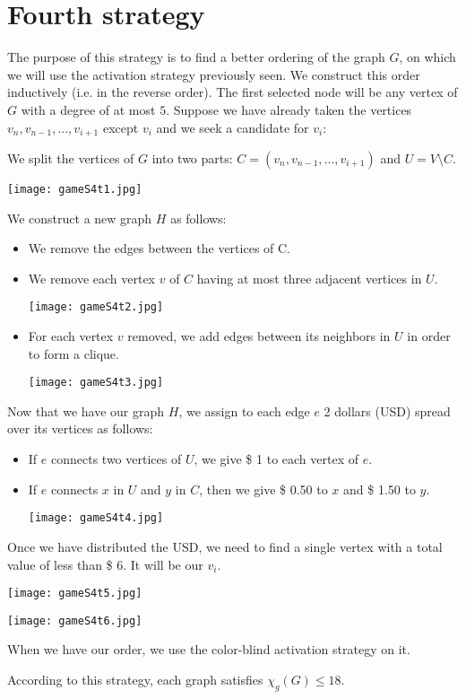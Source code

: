 \section{Fourth strategy}

The purpose of this strategy is to find a better ordering of the graph $G$, on which we will use the activation strategy previously seen. We construct this order inductively (i.e. in the reverse order). The first selected node will be any vertex of $G$ with a degree of at most $5$.
Suppose we have already taken the vertices $v_{n}, v_{n-1}, ..., v_{i+1}$ except $v_{i}$ and we seek a candidate for $v_{i}$:

We split the vertices of $G$ into two parts: $C = (v_{n}, v_{n-1}, ..., v_{i+1})$ and $U = V \setminus C$.

\texttt{[image: gameS4t1.jpg]}

We construct a new graph $H$ as follows:
\begin{itemize}
\item We remove the edges between the vertices of C.
\item We remove each vertex $v$ of $C$ having at most three adjacent vertices in $U$.

\texttt{[image: gameS4t2.jpg]}

\item For each vertex $v$ removed, we add edges between its neighbors in $U$ in order to form a clique.

\texttt{[image: gameS4t3.jpg]}

\end{itemize}

Now that we have our graph $H$, we assign to each edge $e$ 2 dollars (USD) spread over its vertices as follows:
\begin{itemize}
\item If $e$ connects two vertices of $U$, we give \$ 1 to each vertex of $e$.
\item If $e$ connects $x$ in $U$ and $y$ in $C$, then we give \$ 0.50 to $x$ and \$ 1.50 to $y$.

\texttt{[image: gameS4t4.jpg]}

\end{itemize}

Once we have distributed the USD, we need to find a single vertex with a total value of less than \$ 6.
It will be our $v_{i}$.

\texttt{[image: gameS4t5.jpg]}

\texttt{[image: gameS4t6.jpg]}

When we have our order, we use the color-blind activation strategy on it.

According to this strategy, each graph satisfies $\chi_{g}(G) \leq 18$.